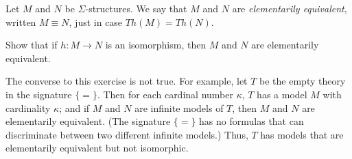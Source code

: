 

\begin{defn} Let $M$ and $N$ be $\Sigma$-structures.  We say that
  $M$ and $N$ are \emph{elementarily equivalent}, written $M\equiv N$,
  just in case $Th(M)=Th(N)$. \end{defn}

\begin{exercise} Show that if $h:M\to N$ is an isomorphism, then $M$
  and $N$ are elementarily equivalent.  \end{exercise}

The converse to this exercise is not true.  For example, let $T$ be
the empty theory in the signature $\{ = \}$.  Then for each cardinal
number $\kappa$, $T$ has a model $M$ with cardinality $\kappa$; and if
$M$ and $N$ are infinite models of $T$, then $M$ and $N$ are
elementarily equivalent.  (The signature $\{ =\}$ has no formulas that
can discriminate between two different infinite models.)  Thus, $T$
has models that are elementarily equivalent but not isomorphic.


